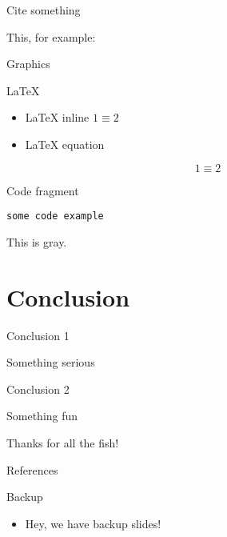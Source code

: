 \documentclass[12pt,ignorenonframetext,aspectratio=169]{beamer}
\newif\ifbibliography
\providecommand{\tightlist}{%
  \setlength{\itemsep}{0pt}\setlength{\parskip}{0pt}}
\begin{document}
\begin{frame}{Cite something}
\protect\hypertarget{cite-something}{}

This, for example: \cite{wadlerTheoremsFree1989}

\end{frame}

\begin{frame}{Graphics}
\protect\hypertarget{graphics}{}

\centering

\end{frame}

\begin{frame}{LaTeX}
\protect\hypertarget{latex}{}

\begin{itemize}
\tightlist
\item
  LaTeX inline \(1 \equiv 2\)
\item
  LaTeX equation
\end{itemize}

\[
1 \equiv 2
\]

\end{frame}

\begin{frame}[fragile]{Code fragment}
\protect\hypertarget{code-fragment}{}

\begin{verbatim}
some code example
\end{verbatim}

\color{gray} This is gray.

\end{frame}

\hypertarget{conclusion}{%
\section{Conclusion}\label{conclusion}}

\begin{frame}{Conclusion 1}
\protect\hypertarget{conclusion-1}{}

Something serious

\end{frame}

\begin{frame}{Conclusion 2}
\protect\hypertarget{conclusion-2}{}

Something fun

\end{frame}

\begin{frame}

\centering

Thanks for all the fish!

\end{frame}

\begin{frame}[allowframebreaks]{References}
\protect\hypertarget{references}{}

\bibliographytrue
\printbibliography[heading=none]

\end{frame}

\begin{frame}{Backup}
\protect\hypertarget{backup}{}

\begin{itemize}
\tightlist
\item
  Hey, we have backup slides!
\end{itemize}

\end{frame}
\end{document}
